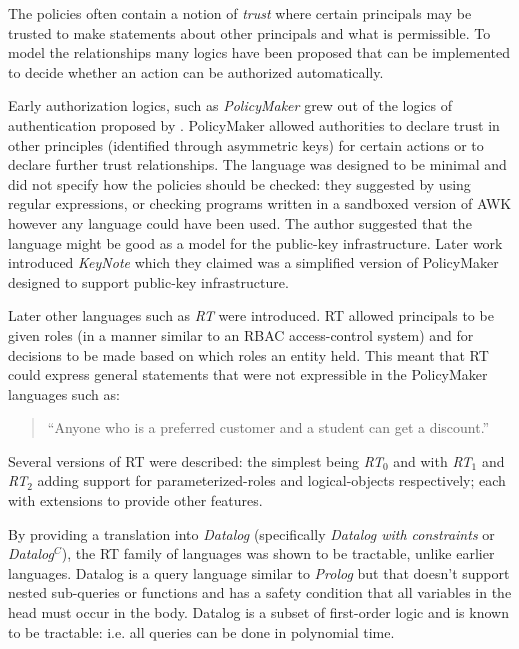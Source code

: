 \documentclass[a4paper,sfsidenotes]{tufte-book}
\begin{document}
The policies often contain a notion of \emph{trust} where certain principals
may be trusted to make statements about other principals and what is
permissible. To model the relationships many logics have been proposed that can
be implemented to decide whether an action can be authorized automatically.

Early authorization logics, such as \emph{PolicyMaker}\cite{Blaze:dj} grew out
of the logics of authentication proposed by
\citeauthor*{Wobber:1994dh}\cite{Lampson:1992jg}\cite{Wobber:1994dh}.
PolicyMaker allowed authorities to declare trust in other principles (identified
through asymmetric keys) for certain actions or to declare further trust
relationships. The language was designed to be minimal and did not specify how
the policies should be checked: they suggested by using regular expressions, or
checking programs written in a sandboxed version of AWK however any language
could have been used. The author suggested that the language might be good as a
model for the public-key infrastructure. Later work introduced
\emph{KeyNote}\cite{Blaze:1999fa} which they claimed was a simplified version of
PolicyMaker designed to support public-key infrastructure.

Later other languages such as \emph{RT}\cite{Li:2002if} were introduced. RT
allowed principals to be given roles (in a manner similar to an \ac{RBAC}
access-control system) and for decisions to be made based on which roles an
entity held. This meant that RT could express general statements that were not
expressible in the PolicyMaker languages such as:
\begin{quote}
  ``Anyone who is a preferred customer and a student can get a discount.''
\end{quote}
Several versions of RT were described: the simplest being
\emph{RT$_0$}\cite{Li:2003tj} and with \emph{RT$_1$} and \emph{RT$_2$} adding support for
parameterized-roles and logical-objects respectively; each with extensions to
provide other features.

By providing a translation into \emph{Datalog} (specifically \emph{Datalog with
  constraints} or \emph{Datalog$^C$\cite{Li:2003ix}}), the RT family of
languages was shown to be tractable, unlike earlier languages. Datalog is a
query language similar to \emph{Prolog} but that doesn't support nested
sub-queries or functions and has a safety condition that all variables in
the head must occur in the body. Datalog is a subset of first-order logic
and is known to be tractable: i{.}e{.} all queries can be done in polynomial
time.
\end{document}
